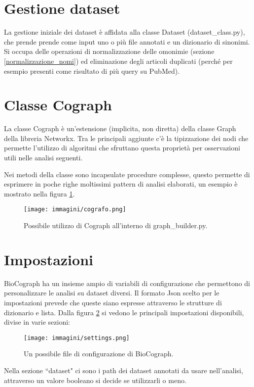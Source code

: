 \documentclass[12pt]{report}
\newcommand{\quotes}[1]{``#1"}
\begin{document}
\section{Gestione dataset}
La gestione iniziale dei dataset è affidata alla classe Dataset (dataset\_class.py), che prende prende come input uno o più file annotati e un dizionario di sinonimi. Si occupa delle operazioni di normalizzazione delle omonimie (sezione \ref{normalizzazione_nomi}) ed eliminazione degli articoli duplicati (perché per esempio presenti come risultato di più query su PubMed).

\section{Classe Cograph}
La classe Cograph è un'estensione (implicita, non diretta) della classe Graph della libreria Networkx. Tra le principali aggiunte c'è la tipizzazione dei nodi che permette l'utilizzo di algoritmi che sfruttano questa proprietà per osservazioni utili nelle analisi seguenti. 

Nei metodi della classe sono incapsulate procedure complesse, questo permette di esprimere in poche righe moltissimi pattern di analisi elaborati, un esempio è mostrato nella figura \ref{fig:cografo}.

\begin{figure}[!htb]
\centering
\texttt{[image: immagini/cografo.png]}
\caption{\footnotesize{Possibile utilizzo di Cograph all'interno di graph\_builder.py.}}
\label{fig:cografo}
\end{figure}

\section{Impostazioni}
BioCograph ha un insieme ampio di variabili di configurazione che permettono di personalizzare le analisi su dataset diversi. Il formato Json scelto per le impostazioni prevede che queste siano espresse attraverso le strutture di dizionario e lista.
Dalla figura \ref{fig:impostazioni} si vedono le principali impostazioni disponibili, divise in varie sezioni:

\begin{figure}[!htb]
\centering
\texttt{[image: immagini/settings.png]} 
\caption{\footnotesize{Un possibile file di configurazione di BioCograph.}}
\label{fig:impostazioni}
\end{figure}

Nella sezione \quotes{dataset} ci sono i path dei dataset annotati da usare nell'analisi, attraverso un valore booleano si decide se utilizzarli o meno.
\end{document}
